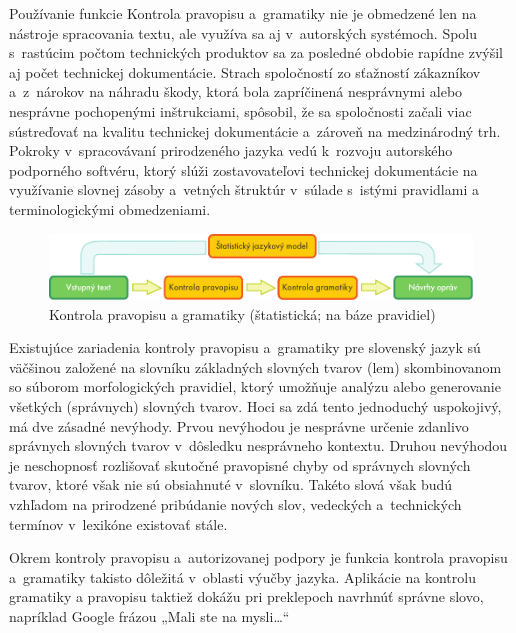 Používanie funkcie Kontrola pravopisu a~gramatiky nie je obmedzené
len na nástroje spracovania textu, ale využíva sa aj
v~autorských systémoch. Spolu s~rastúcim počtom technických
produktov sa za posledné obdobie rapídne zvýšil aj počet technickej
dokumentácie. Strach spoločností zo sťažností zákazníkov
a~z~nárokov na náhradu škody, ktorá bola zapríčinená nesprávnymi
alebo nesprávne pochopenými inštrukciami, spôsobil, že sa
spoločnosti začali viac sústreďovať na kvalitu technickej
dokumentácie a~zároveň na medzinárodný trh. Pokroky
v~spracovávaní prirodzeného jazyka vedú k~rozvoju autorského
podporného softvéru, ktorý slúži zostavovateľovi technickej
dokumentácie na využívanie slovnej zásoby a~vetných štruktúr
v~súlade s~istými pravidlami a terminologickými
obmedzeniami.

\begin{figure}[htb]
  \center
  \includegraphics[width=\textwidth]{../_media/slovak/language_checking}
  \caption{Kontrola pravopisu a gramatiky (štatistická; na báze pravidiel)}
  \label{fig:langcheckingaarch_sk}
\end{figure}


Existujúce zariadenia kontroly pravopisu a~gramatiky pre slovenský
jazyk sú väčšinou založené na slovníku základných slovných
tvarov (lem) skombinovanom so súborom morfologických pravidiel, ktorý
umožňuje analýzu alebo generovanie všetkých (správnych) slovných
tvarov. Hoci sa zdá tento jednoduchý uspokojivý, má dve
zásadné nevýhody. Prvou nevýhodou je nesprávne určenie zdanlivo
správnych slovných tvarov v~dôsledku nesprávneho kontextu. Druhou
nevýhodou je neschopnosť rozlišovať skutočné pravopisné chyby od
správnych slovných tvarov, ktoré však nie sú obsiahnuté
v~slovníku. Takéto slová však budú vzhľadom na prirodzené
pribúdanie nových slov, vedeckých a~technických termínov
v~lexikóne existovať stále.

Okrem kontroly pravopisu a~autorizovanej podpory je funkcia kontrola
pravopisu a~gramatiky takisto dôležitá v~oblasti výučby jazyka. Aplikácie na kontrolu gramatiky a pravopisu taktiež dokážu pri preklepoch navrhnúť správne slovo, napríklad Google frázou „Mali ste na mysli\dots“

